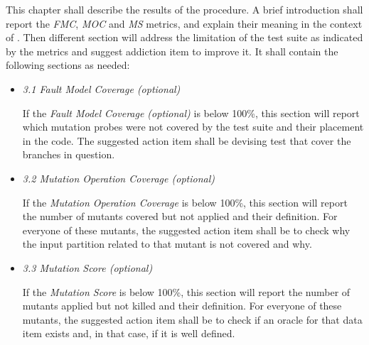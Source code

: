   This chapter shall describe the results of the \DAMA procedure. A brief introduction shall report the \emph{FMC}, \emph{MOC} and \emph{MS} metrics, and explain their meaning in the context of \DAMA.
  Then different section will address the limitation of the test suite as indicated by the metrics and suggest addiction item to improve it.
  It shall contain the following sections as needed:
  \begin{itemize}


    \item \emph{3.1 Fault Model Coverage (optional)}


    If the \emph{Fault Model Coverage (optional)} is below 100\%, this section will report which mutation probes were not covered by the test suite and their placement in the code. The suggested action item shall be devising test that cover the branches in question.


    \item \emph{3.2 Mutation Operation Coverage (optional)}


    If the \emph{Mutation Operation Coverage} is below 100\%, this section will report the number of mutants covered but not applied and their definition.
    For everyone of these mutants, the suggested action item shall be to check why the input partition related to that mutant is not covered and why.


    \item \emph{3.3 Mutation Score (optional)}


    If the \emph{Mutation Score} is below 100\%, this section will report the number of mutants applied but not killed and their definition.
    For everyone of these mutants, the suggested action item shall be to check if an oracle for that data item exists and, in that case, if it is well defined.


  \end{itemize}

\ENDCHANGEDFINAL
